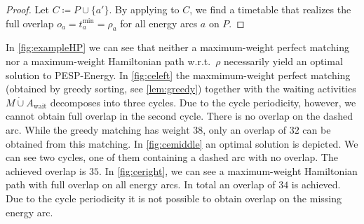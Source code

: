 \documentclass[11pt,a4paper]{article}
\newcommand{\dotcup}{\mathbin{\dot\cup}}
\newcommand{\wait}{\mathrm{wait}}
\newcommand{\energyact}{M}               %
\newcommand{\pespenergy}{PESP-Energy\xspace}
\newcommand{\w}{\rho} %
\theoremstyle{definition}
\theoremstyle{remark}
\begin{document}
\begin{proof}
    Let $C \coloneqq P \cup \{a'\}$.
    By applying  to 
    $C$, we find a timetable that realizes the full overlap $o_a = t_a^{\min} = \w_a$ for all energy arcs $a$ on $P$.
\end{proof}

In \cref{fig:exampleHP} we can see that neither a maximum-weight perfect matching nor a maximum-weight Hamiltonian path w.r.t.\ $\w$ necessarily yield an optimal solution to \pespenergy. In \cref{fig:celeft} the maxmimum-weight perfect matching (obtained by greedy sorting, see \cref{lem:greedy}) together with the waiting activities $\energyact\dotcup A_{\wait}$ decomposes into three cycles. Due to the cycle periodicity, however, we cannot obtain full overlap in the second cycle. There is no overlap on the dashed arc. While the greedy matching has weight $38$, only an overlap of $32$ can be obtained from this matching. 
In \cref{fig:cemiddle} an optimal solution is depicted. We can see two cycles, one of them containing a dashed arc with no overlap. The achieved overlap is $35$.
In \cref{fig:ceright}, we can see a maximum-weight Hamiltonian path with full overlap on all energy arcs. In total an overlap of $34$ is achieved. Due to the cycle periodicity it is not possible to obtain overlap on the missing energy arc.
\end{document}
